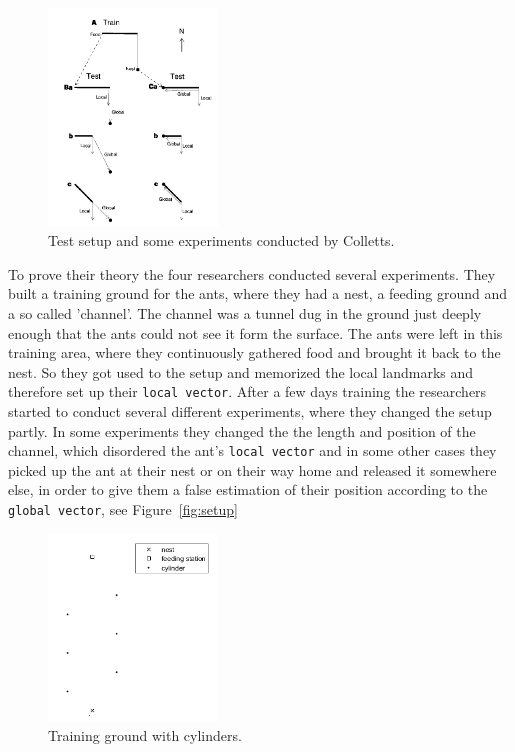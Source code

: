 \documentclass[11pt]{article}
\begin{document}
\begin{figure}
	\includegraphics[width=0.4\textwidth]{experiments_setup.png}
	\caption{Test setup and some experiments conducted by Colletts. \cite{wehner}}
	\label{fig:setup}
\end{figure}

		To prove their theory the four researchers conducted several experiments. They built a training ground for the ants, where they had a nest, a feeding ground and a so called 'channel'. The channel was a tunnel dug in the ground just deeply enough that the ants could not see it form the surface. The ants were left in this training area, where they continuously gathered food and brought it back to the nest. So they got used to the setup and memorized the local landmarks and therefore set up their \texttt{local vector}. After a few days training the researchers started to conduct several different experiments, where they changed the setup partly. In some experiments they changed the the length and position of the channel, which disordered the ant's \texttt{local vector} and in some other cases they picked up the ant at their nest or on their way home and released it somewhere else, in order to give them a false estimation of their position according to the \texttt{global vector}, see Figure~\vref{fig:setup}


\begin{figure}
	\includegraphics[width=0.4\textwidth]{cylinders.png}
	\caption{Training ground with cylinders.}
	\label{fig:cylinders}
\end{figure}
\end{document}
